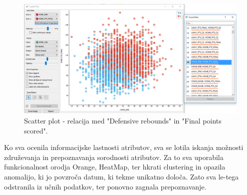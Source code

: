 \documentclass[a4paper,11pt]{article}
\begin{document}
\begin{figure}[H]
\begin{center}
\includegraphics[scale=0.3]{OC_DRB_PTS-FINAL.png}
\caption{Scatter plot - relacija med "Defensive rebounds" in "Final points scored".}
\label{slika2.1}
\end{center}
\end{figure} 

Ko sva ocenila informacijske lastnosti atributov, sva se lotila iskanja možnosti združevanja 
in prepoznavanja sorodnosti atributov. Za to sva uporabila funkcionalnost orodja Orange,
HeatMap, ter hkrati clustering in opazila anomalijo, ki jo povzroča datum, ki tekme unikatno
 določa. Zato sva le-tega odstranila iz učnih podatkov, ter ponovno zagnala prepoznavanje.\\
\end{document}
